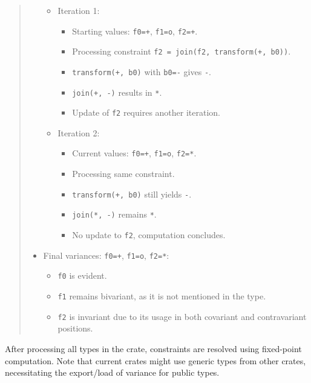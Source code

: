 \documentclass[
  11pt,
  twoside]{report}
\providecommand{\tightlist}{%
  \setlength{\itemsep}{0pt}\setlength{\parskip}{0pt}}
\begin{document}
\begin{quote}
\begin{itemize}
  \begin{itemize}
  \tightlist
  \item
    Iteration 1:

    \begin{itemize}
    \tightlist
    \item
      Starting values: \texttt{f0=+}, \texttt{f1=o}, \texttt{f2=+}.
    \item
      Processing constraint
      \texttt{f2\ =\ join(f2,\ transform(+,\ b0))}.
    \item
      \texttt{transform(+,\ b0)} with \texttt{b0=-} gives \texttt{-}.
    \item
      \texttt{join(+,\ -)} results in \texttt{*}.
    \item
      Update of \texttt{f2} requires another iteration.
    \end{itemize}
  \item
    Iteration 2:

    \begin{itemize}
    \tightlist
    \item
      Current values: \texttt{f0=+}, \texttt{f1=o}, \texttt{f2=*}.
    \item
      Processing same constraint.
    \item
      \texttt{transform(+,\ b0)} still yields \texttt{-}.
    \item
      \texttt{join(*,\ -)} remains \texttt{*}.
    \item
      No update to \texttt{f2}, computation concludes.
    \end{itemize}
  \end{itemize}
\item
  Final variances: \texttt{f0=+}, \texttt{f1=o}, \texttt{f2=*}:

  \begin{itemize}
  \tightlist
  \item
    \texttt{f0} is evident.
  \item
    \texttt{f1} remains bivariant, as it is not mentioned in the type.
  \item
    \texttt{f2} is invariant due to its usage in both covariant and
    contravariant positions.
  \end{itemize}
\end{itemize}
\end{quote}

After processing all types in the crate, constraints are resolved using
fixed-point computation. Note that current crates might use generic
types from other crates, necessitating the export/load of variance for
public types.
\end{document}
